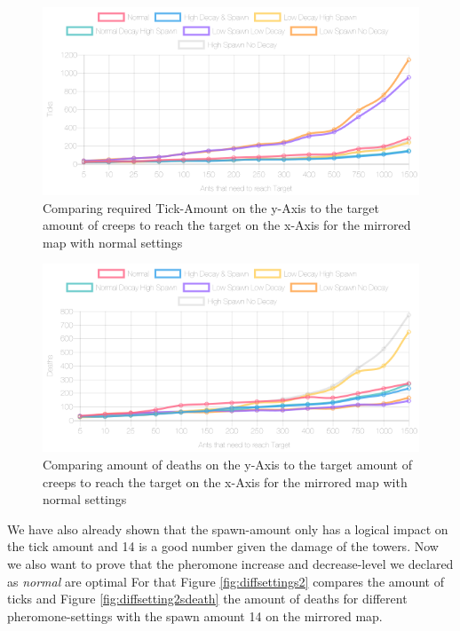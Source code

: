 \begin{figure}[H]
  \centering
  \includegraphics[width=1\linewidth]{images/mirroredwithtower-ticks-line}
  \caption{Comparing required Tick-Amount on the y-Axis to the target amount of creeps to reach the target on the x-Axis for the mirrored map with normal settings}
  \label{fig:diffsettings}
\end{figure}

\begin{figure}[H]
  \centering
  \includegraphics[width=1\linewidth]{images/mirroredwithtower-deaths-line}
  \caption{Comparing amount of deaths on the y-Axis to the target amount of creeps to reach the target on the x-Axis for the mirrored map with normal settings}
  \label{fig:diffsettingsdeath}
\end{figure}

We have also already shown that the spawn-amount only has a logical impact on the tick amount and 14 is a good number given the damage of the towers. Now we also want to prove that the pheromone increase and decrease-level we declared as \textit{normal} are optimal
For that Figure \ref{fig:diffsettings2} compares the amount of ticks and Figure \ref{fig:diffsetting2sdeath} the amount of deaths for different pheromone-settings with the spawn amount 14 on the mirrored map.

